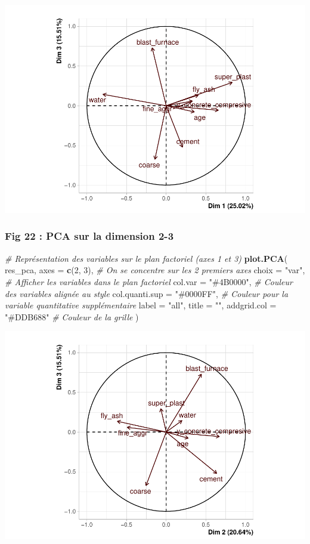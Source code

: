 \documentclass[
  12pt,
]{article}
\newenvironment{Shaded}{\begin{snugshade}}{\end{snugshade}}
\newcommand{\AttributeTok}[1]{\textcolor[rgb]{0.13,0.29,0.53}{#1}}
\newcommand{\CommentTok}[1]{\textcolor[rgb]{0.56,0.35,0.01}{\textit{#1}}}
\newcommand{\DecValTok}[1]{\textcolor[rgb]{0.00,0.00,0.81}{#1}}
\newcommand{\FunctionTok}[1]{\textcolor[rgb]{0.13,0.29,0.53}{\textbf{#1}}}
\newcommand{\NormalTok}[1]{#1}
\newcommand{\StringTok}[1]{\textcolor[rgb]{0.31,0.60,0.02}{#1}}
\begin{document}
\begin{center}\includegraphics{rmd_final_files/figure-latex/unnamed-chunk-46-1} \end{center}

\subsubsection{Fig 22 : PCA sur la dimension
2-3}\label{fig-22-pca-sur-la-dimension-2-3}

\begin{Shaded}
\begin{Highlighting}[]
\CommentTok{\# Représentation des variables sur le plan factoriel (axes 1 et 3)}
\FunctionTok{plot.PCA}\NormalTok{(}
\NormalTok{  res\_pca,}
  \AttributeTok{axes =} \FunctionTok{c}\NormalTok{(}\DecValTok{2}\NormalTok{, }\DecValTok{3}\NormalTok{),             }\CommentTok{\# On se concentre sur les 2 premiers axes}
  \AttributeTok{choix =} \StringTok{"var"}\NormalTok{,              }\CommentTok{\# Afficher les variables dans le plan factoriel}
  \AttributeTok{col.var =} \StringTok{"\#4B0000"}\NormalTok{,        }\CommentTok{\# Couleur des variables alignée au style}
  \AttributeTok{col.quanti.sup =} \StringTok{"\#0000FF"}\NormalTok{, }\CommentTok{\# Couleur pour la variable quantitative supplémentaire}
  \AttributeTok{label =} \StringTok{"all"}\NormalTok{,}
  \AttributeTok{title =} \StringTok{""}\NormalTok{,}
  \AttributeTok{addgrid.col =} \StringTok{"\#DDB688"}     \CommentTok{\# Couleur de la grille}
\NormalTok{)}
\end{Highlighting}
\end{Shaded}

\begin{center}\includegraphics{rmd_final_files/figure-latex/unnamed-chunk-47-1} \end{center}
\end{document}
